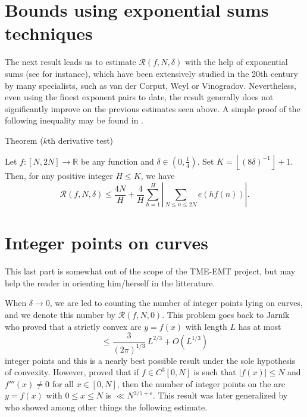 \section{Bounds using exponential sums techniques}


The next result leads us to estimate $\mathcal {R}(f,N,\delta)$ with the help
of exponential sums (see 
\cite{Graham-Kolesnik*91}
for instance), which have been extensively
studied in the 20th century by many specialists, such as van der Corput,
Weyl or Vinogradov. Nevertheless, even using the finest exponent pairs to
date, the result generally does not significantly improve on the previous
estimates seen above. A simple proof of the following inequality may be found
in 
\cite{Filaseta*90}.

\begin{thm}{Theorem ($k$th derivative test)}

Let $f : [N,2N] \longrightarrow \mathbb {R}$ be any function and $\delta \in
  \left( 0,\frac{1}{4} \right)$. Set $K = \left \lfloor (8 \delta)^{-1} \right
  \rfloor +1$. Then, for any positive integer $H \leqslant K$, we have 
$$\mathcal {R}(f,N,\delta) \leqslant \frac{4N}{H} + \frac{4}{H} \sum_{h=1}^{H}
  \left | \sum_{N \leqslant n \leqslant 2N} e(hf(n)) \right |.$$ 
\end{thm}




\section{Integer points on curves}



This last part is somewhat out of the scope of the TME-EMT project, but may
help the reader in orienting him/herself in the litterature.

\par 
When $\delta \longrightarrow 0$, we are led to counting the number of integer
points lying on curves, and we denote this number by $\mathcal
{R}(f,N,0)$. This problem goes back to Jarn\'ik
\cite{Jarnik*25}
who proved that a
strictly convex arc $y=f(x)$ with length $L$ has at most 
$$\leqslant \frac{3}{(2 \pi)^{1/3}} \, L^{2/3} + O \left( L^{1/3} \right)$$ 
integer points and this is a nearly best possible result under the sole
hypothesis of convexity. However, 
\cite{Swinnerton-Dyer*74}
proved that if $f
\in C^3[0,N]$ is such that $|f(x)| \leqslant N$ and $f'''(x) \neq 0$ for all
$x \in [0,N]$, then the number of integer points on the arc $y=f(x)$ with $0
\leqslant x \leqslant N$ is $\ll N^{3/5+\varepsilon}$. This result was later
generalized by
\cite{Bombieri-Pila*89}
who showed among
other things the following estimate.  

